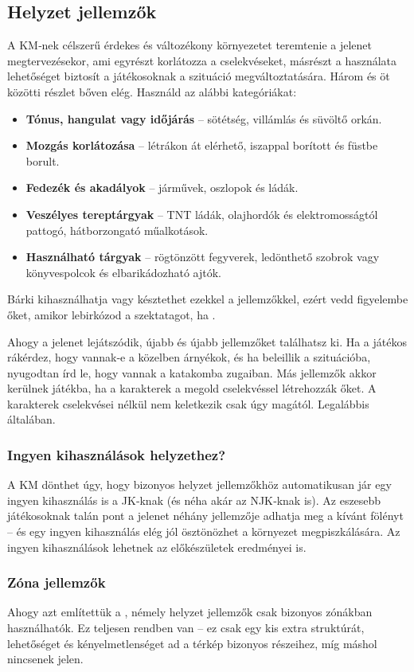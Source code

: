 \subsection{Helyzet jellemzők}

A KM‑nek célszerű érdekes és változékony környezetet teremtenie a jelenet megtervezésekor, ami egyrészt korlátozza a cselekvéseket, másrészt a használata lehetőséget biztosít a játékosoknak a szituáció megváltoztatására. Három és öt közötti részlet bőven elég. Használd az alábbi kategóriákat:

\begin{itemize}
    \item \textbf{Tónus, hangulat vagy időjárás} – sötétség, villámlás és süvöltő orkán.
    \item \textbf{Mozgás korlátozása} – létrákon át elérhető, iszappal borított és füstbe borult.
    \item \textbf{Fedezék és akadályok} – járművek, oszlopok és ládák.
    \item \textbf{Veszélyes tereptárgyak} – TNT ládák, olajhordók és elektromosságtól pattogó, hátborzongató műalkotások.
    \item \textbf{Használható tárgyak} – rögtönzött fegyverek, ledönthető szobrok vagy könyvespolcok és elbarikádozható ajtók.
\end{itemize}

Bárki kihasználhatja vagy késztethet ezekkel a jellemzőkkel, ezért vedd figyelembe őket, amikor lebirkózod a szektatagot, ha .

Ahogy a jelenet lejátszódik, újabb és újabb jellemzőket találhatsz ki. Ha a játékos rákérdez, hogy vannak‑e a közelben árnyékok, és ha beleillik a szituációba, nyugodtan írd le, hogy  vannak a katakomba zugaiban. Más jellemzők akkor kerülnek játékba, ha a karakterek a megold cselekvéssel létrehozzák őket. A karakterek cselekvései nélkül nem keletkezik csak úgy  magától. Legalábbis általában.

\subsubsection{Ingyen kihasználások helyzethez?}

A KM dönthet úgy, hogy bizonyos helyzet jellemzőkhöz automatikusan jár egy ingyen kihasználás is a JK‑knak (és néha akár az NJK‑knak is). Az eszesebb játékosoknak talán pont a jelenet néhány jellemzője adhatja meg a kívánt fölényt – és egy ingyen kihasználás elég jól ösztönözhet a környezet megpiszkálására. Az ingyen kihasználások lehetnek az előkészületek eredményei is.

\subsubsection{Zóna jellemzők}

Ahogy azt említettük a , némely helyzet jellemzők csak bizonyos zónákban használhatók. Ez teljesen rendben van – ez csak egy kis extra struktúrát, lehetőséget és kényelmetlenséget ad a térkép bizonyos részeihez, míg máshol nincsenek jelen.
